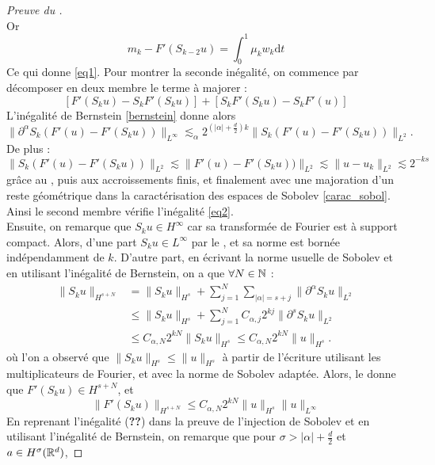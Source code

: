 \documentclass[11pt,a4paper]{article}
\begin{document}
\begin{proof}[Preuve du ]
\begin{equation*}
\end{equation*}
Or 
\begin{equation*}
m_k - F'(S_{k-2}u) = \int_0^1 \mu_k w_k\mathrm{d}t
\end{equation*}
Ce qui donne \eqref{eq1}.
Pour montrer la seconde inégalité, on commence par décomposer en deux membre le terme à majorer :
\begin{equation*}
\left[ F'(S_{k}u) - S_k F'(S_{k}u) \right] + \left[ S_k F'(S_{k}u) - S_kF'(u) \right]
\end{equation*}
L'inégalité de Bernstein \eqref{bernstein} donne alors 
\begin{equation*}
\|\partial^\alpha S_k (F'(u) - F'(S_ku) )\|_{L^\infty} \lesssim_\alpha 2^{(|\alpha| + \frac{d}{2})k } \|S_k (F'(u) - F'(S_ku) )\|_{L^2}.
\end{equation*}
De plus :
\begin{equation*}
\|S_k (F'(u) - F'(S_ku) )\|_{L^2} \lesssim \|F'(u) - F'(S_ku) )\|_{L^2} \lesssim \|u-u_k\|_{L^2} \lesssim 2^{-ks}
\end{equation*}
grâce au , puis aux accroissements finis, et finalement avec une majoration d'un reste géométrique dans la caractérisation des espaces de Sobolev \eqref{carac_sobol}. Ainsi le second membre vérifie l'inégalité \eqref{eq2}. \\
Ensuite, on remarque que $S_ku \in H^\infty$ car sa transformée de Fourier est à support compact. Alors, d'une part $S_ku \in L^\infty	$ par le , et sa norme est bornée indépendamment de $k$. D'autre part, en écrivant la norme usuelle de Sobolev et en utilisant l'inégalité de Bernstein, on a que $\forall N \in \mathbb N$ :
\begin{align*}
 \|S_ku\|_{H^{s+N}} &= \|S_ku\|_{H^s} + \sum_{j=1}^N\sum_{|\alpha|=s+j} \|\partial^\alpha S_k u \|_{L^2} \\
& \leq \|S_ku\|_{H^s} + \sum_{j=1}^N C_{\alpha,j} 2^{kj} \|\partial^s S_ku\|_{L^2} \\
& \leq C_{\alpha,N} 2^{kN}\|S_ku\|_{H^s} \leq C_{\alpha,N} 2^{kN}\|u\|_{H^s} .
\end{align*}
où l'on a observé que $\|S_ku\|_{H^s} \leq \|u\|_{H^s}$ à partir de l'écriture utilisant les multiplicateurs de Fourier, et avec la norme de Sobolev adaptée. Alors, le  donne que $F'(S_ku)\in H^{s+N}$, et 
\begin{equation}\label{utillem}
\|F'(S_ku)\|_{H^{s+N}} \leq C_{\alpha,N}2^{kN}\|u\|_{H^s}\|u\|_{L^\infty}
\end{equation}
En reprenant l'inégalité (\textbf{??}) dans la preuve de l'injection de Sobolev et en utilisant l'inégalité de Bernstein, on remarque que pour $\sigma > |\alpha| + \frac{d}{2}$ et $a\in H^\sigma(\mathbb R^d)$,

\end{proof}
\end{document}
